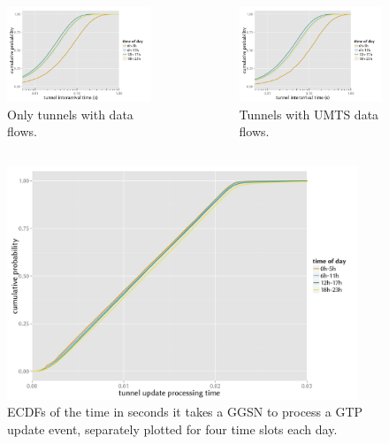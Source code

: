 \documentclass{beamer}
\begin{document}
\begin{frame}
\begin{columns}
		\begin{figure}
			\includegraphics[width=0.7\columnwidth]{extras/R-IAT-fromflows-ecdfs-2h.png}
			\vspace{-4mm}
			\caption{Only tunnels with data flows.}
		\end{figure}
		\vspace{-10mm}
		\begin{figure}
			\includegraphics[width=0.7\columnwidth]{extras/R-IAT-fromflows-umts-ecdfs-2h.png}
			\vspace{-4mm}
			\caption{Tunnels with UMTS data flows.}
		\end{figure}
	\end{columns}
\end{frame}

\begin{frame}
	\begin{figure}
		\centering
		\includegraphics[height=7cm]{extras/R-update-time-cdfs.png}
		\caption{ECDFs of the time in seconds it takes a GGSN to process a GTP update event, separately plotted for four time slots each day.}
	\end{figure}
\end{frame}
\end{document}
